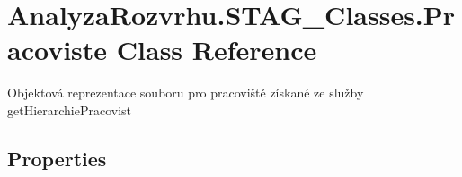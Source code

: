 \hypertarget{class_analyza_rozvrhu_1_1_s_t_a_g___classes_1_1_pracoviste}{}\section{Analyza\+Rozvrhu.\+S\+T\+A\+G\+\_\+\+Classes.\+Pracoviste Class Reference}
\label{class_analyza_rozvrhu_1_1_s_t_a_g___classes_1_1_pracoviste}


Objektová reprezentace souboru pro pracoviště získané ze služby get\+Hierarchie\+Pracovist  


\subsection*{Properties}

